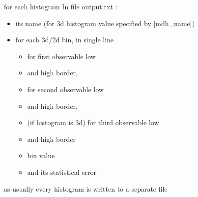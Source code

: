 \documentclass{article}
\begin{document}
for each histogram In file output.txt : 
\begin{itemize}
\item its name (for 3d histogram value specified by [mdh\_name])

\item for each 3d/2d bin, in single line

\begin{itemize}
\item for first observable low 
\item and high border, 
\item for second observable low
\item  and high border, 
\item (if histogram is 3d) for third observable low 
\item and high border
\item bin value 
\item and its statistical error
\end{itemize}
\end{itemize}

\noindent 
as usually every histogram is written to a separate file
\end{document}
